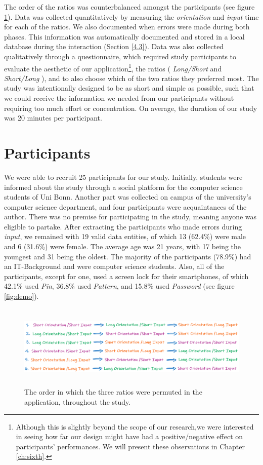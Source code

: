 The order of the ratios was counterbalanced amongst the participants (see figure \ref{fig:permutation}). Data was collected quantitatively by measuring the \textit{orientation} and \textit{input} time for each of the ratios. We also documented when errors were made during both phases. This information was automatically documented and stored in a local database during the interaction (Section \ref{4.3}). Data was also collected qualitatively through a questionnaire, which required study participants to evaluate the aesthetic of our application\footnote{Although this is slightly beyond the scope of our research,we were interested in seeing how far our design might have had a positive/negative effect on participants' performances. We will present these observations in Chapter \ref{ch:sixth}.}, the ratios ( \textit{Long/Short} and \textit{Short/Long} ), and to also choose which of the two ratios they preferred most. The study was intentionally designed to be as short and simple as possible, such that we could receive the information we needed from our participants without requiring too much effort or concentration. On average, the duration of our study was 20 minutes per participant. 

\section{Participants} \label{5.2}

We were able to recruit 25 participants for our study. Initially, students were informed about the study through a social platform for the computer science students of Uni Bonn. Another part was collected on campus of the university's computer science department, and four participants were acquaintances of the author. There was no premise for participating in the study, meaning anyone was eligible to partake. After extracting the participants who made errors during \textit{input}, we remained with 19 valid data entities, of which 13 (62.4\%) were male and 6 (31.6\%) were female. The average age was 21 years, with 17 being the youngest and 31 being the oldest. The majority of the participants (78.9\%) had an IT-Background and were computer science students. Also, all of the participants, except for one, used a screen lock for their smartphones, of which 42.1\% used \textit{Pin}, 36.8\% used \textit{Pattern}, and 15.8\% used \textit{Password} (see figure \ref{fig:demo}). 

\begin{figure}[t!]
\centering
\includegraphics[width=14cm, height=4cm]{Chapters/graphics/permutation.PNG}
\caption{The order in which the three ratios were permuted in the application, throughout the study.}
\label{fig:permutation}
\end{figure}


